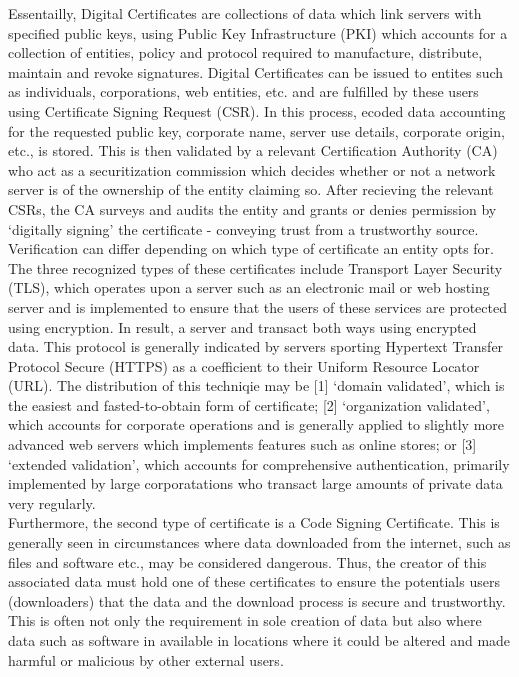 \documentclass[11pt, english]{article}
\begin{document}
	Essentailly, Digital Certificates are collections of data which link servers with specified public keys, using Public Key Infrastructure (PKI) which accounts for a collection of entities, policy and protocol required to manufacture, distribute, maintain and revoke signatures. Digital Certificates can be issued to entites such as individuals, corporations, web entities, etc. and are fulfilled by these users using Certificate Signing Request (CSR). In this process, ecoded data accounting for the requested public key, corporate name, server use details, corporate origin, etc., is stored. This is then validated by a relevant Certification Authority (CA) who act as a securitization commission which decides whether or not a network server is of the ownership of the entity claiming so. After recieving the relevant CSRs, the CA surveys and audits the entity and grants or denies permission by `digitally signing' the certificate - conveying trust from a trustworthy source.\\

	Verification can differ depending on which type of certificate an entity opts for. The three recognized types of these certificates include Transport Layer Security (TLS), which operates upon a server such as an electronic mail or web hosting server and is implemented to ensure that the users of these services are protected using encryption. In result, a server and transact both ways using encrypted data. This protocol is generally indicated by servers sporting Hypertext Transfer Protocol Secure (HTTPS) as a coefficient to their Uniform Resource Locator (URL). The distribution of this techniqie may be [1] `domain validated', which is the easiest and fasted-to-obtain form of certificate; [2] `organization validated', which accounts for corporate operations and is generally applied to slightly more advanced web servers which implements features such as online stores; or [3] `extended validation', which accounts for comprehensive authentication, primarily implemented by large corporatations who transact large amounts of private data very regularly.\\

	Furthermore, the second type of certificate is a Code Signing Certificate. This is generally seen in circumstances where data downloaded from the internet, such as files and software etc., may be considered dangerous. Thus, the creator of this associated data must hold one of these certificates to ensure the potentials users (downloaders) that the data and the download process is secure and trustworthy. This is often not only the requirement in sole creation of data but also where data such as software in available in locations where it could be altered and made harmful or malicious by other external users.\\
\end{document}
